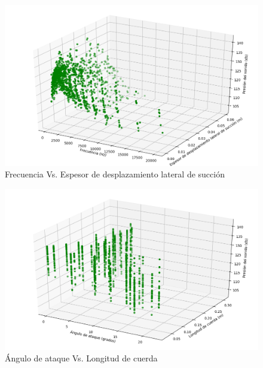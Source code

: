 \documentclass[12pt,spanish]{article} %
\begin{document}
\begin{figure}[H]
  \begin{center}
  \includegraphics[scale=.6]{Figure_4}
  \caption{Frecuencia Vs. Espesor de desplazamiento lateral de succión}
  \label{fig:Figure_4}
  \end{center}
\end{figure}

\begin{figure}[H]
  \begin{center}
  \includegraphics[scale=.6]{Figure_5}
  \caption{Ángulo de ataque Vs. Longitud de cuerda}
  \label{fig:Figure_5}
  \end{center}
\end{figure}
\end{document}
